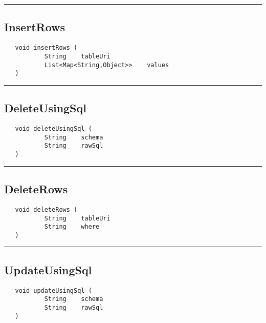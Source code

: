 \rule{15cm}{2pt}
\subsection{InsertRows}
\label{Api:InsertRows}
\begin{verbatim}
   void insertRows (
           String    tableUri
           List<Map<String,Object>>    values
   )
\end{verbatim}



\rule{15cm}{2pt}
\subsection{DeleteUsingSql}
\label{Api:DeleteUsingSql}
\begin{verbatim}
   void deleteUsingSql (
           String    schema
           String    rawSql
   )
\end{verbatim}



\rule{15cm}{2pt}
\subsection{DeleteRows}
\label{Api:DeleteRows}
\begin{verbatim}
   void deleteRows (
           String    tableUri
           String    where
   )
\end{verbatim}



\rule{15cm}{2pt}
\subsection{UpdateUsingSql}
\label{Api:UpdateUsingSql}
\begin{verbatim}
   void updateUsingSql (
           String    schema
           String    rawSql
   )
\end{verbatim}



